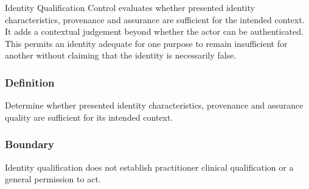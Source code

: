 Identity Qualification Control evaluates whether presented identity characteristics, provenance and assurance are sufficient for the intended context. It adds a contextual judgement beyond whether the actor can be authenticated. This permits an identity adequate for one purpose to remain insufficient for another without claiming that the identity is necessarily false.

\subsubsection*{Definition}

Determine whether presented identity characteristics, provenance and assurance quality are sufficient for its intended context.

\subsubsection*{Boundary}

Identity qualification does not establish practitioner clinical qualification or a general permission to act.

